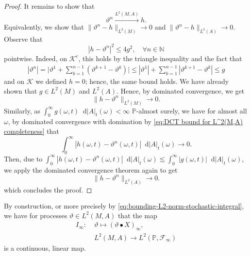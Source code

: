 \documentclass[11pt,a4paper,twoside,openany]{report}
\numberwithin{equation}{section}
\newcommand{\diff}{\mathop{}\!\mathrm{d}}
\theoremstyle{plain} %
\theoremstyle{definition} %
\theoremstyle{remark} %
\begin{document}
\begin{proof}
It remains to show that 
\begin{equation*}
    \vartheta^n\overset{L^2(M,A)}{\to}h.
\end{equation*}
Equivalently, we show that \(\lVert\vartheta^n-h\rVert_{L^2(M)}\to 0\) and \(\lVert\vartheta^n-h\rVert_{L^2(A)}\to 0\). Observe that
\begin{equation}\label{eq:DCT bound for L^2(M,A) completeness}
    |h-\vartheta^n|^2\leq 4g^2,\quad\forall n\in\mathbb{N}
\end{equation}
pointwise. Indeed, on \(\mathcal{K}^c\), this holds by the triangle inequality and the fact that
\begin{align*}
    |\vartheta^n|=\bigg|\vartheta^1+\sum_{k=1}^{n-1}(\vartheta^{k+1}-\vartheta^k)\bigg|\leq |\vartheta^1|+\sum_{k=1}^{n-1}|\vartheta^{k+1}-\vartheta^k|\leq g
\end{align*}
and on \(\mathcal{K}\) we defined \(h=0\); hence, the same bound holds.
We have already shown that \(g\in L^2(M)\) and \(L^2(A)\). Hence, by dominated convergence, we get 
\begin{equation*}
    \lVert h-\vartheta^n\rVert_{L^2(M)}\to 0.
\end{equation*}
Similarly, as \(\int_0^{\infty}g(\omega,t)\diff |A|_t(\omega)<\infty\) \(\mathbb{P}\)-almost surely, we have for almost all \(\omega\), by dominated convergence with domination by \eqref{eq:DCT bound for L^2(M,A) completeness} that
\begin{equation*}
    \int_0^{\infty}|h(\omega,t)-\vartheta^n(\omega,t)|\diff |A|_t(\omega)\to 0.
\end{equation*}
Then, due to \(\int_0^{\infty}|h(\omega,t)-\vartheta^n(\omega,t)|\diff |A|_t(\omega)\lesssim\int_0^{\infty}|g(\omega,t)|\diff |A|_t( \omega)\), we apply the dominated convergence theorem again to get
\begin{equation*}
     \lVert h-\vartheta^n\rVert_{L^2(A)}\to 0.
\end{equation*}
which concludes the proof.
\end{proof}

 By construction, or more precisely by \eqref{eq:bounding-L2-norm-stochastic-integral}, we have for processes \(\vartheta\in L^2(M,A)\) that the map
 \begin{align*}\label{eq:final integral map}
    I_{\infty}:\;&\vartheta\mapsto (\vartheta\bullet X)_{\infty},
     \\&L^2(M,A)\to L^2(\mathbb{P},\mathcal{F}_{\infty})
 \end{align*} is a continuous, linear map.
\end{document}
